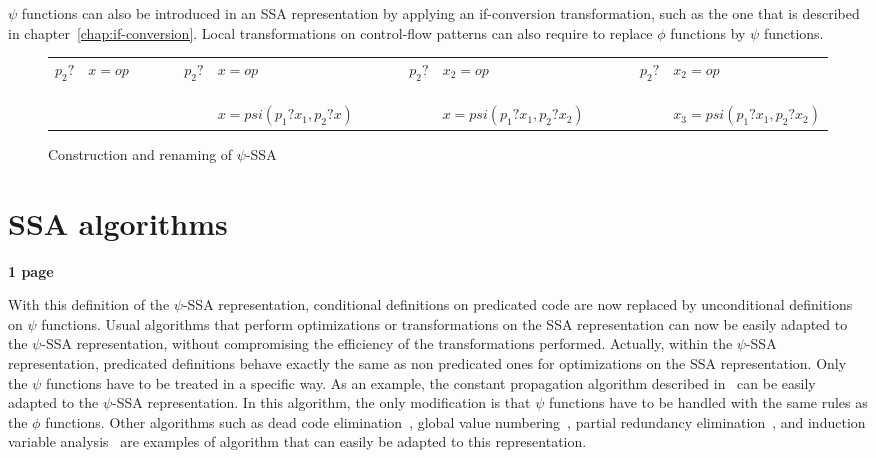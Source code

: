 $\psi$ functions can also be introduced in an SSA representation by
applying an if-conversion transformation, such as the one that is
described in chapter~\ref{chap:if-conversion}. Local transformations
on control-flow patterns can also require to replace $\phi$ functions
by $\psi$ functions.

\begin{figure}
\begin{center}
\footnotesize
\begin{tabular}{lllllllllll}
${p_2?}$ & ${x = op}$ & \ \ \ \  & ${p_2?}$ & ${x = op}$                  & \ \ \ \  & ${p_2?}$ & ${x_2 = op}$               & \ \ \ \  & ${p_2?}$ & ${x_2 = op}$ \\
             &                &          &              & ${x = psi(p_1?x_1, p_2?x)}$ &           &           & ${x = psi(p_1?x_1, p_2?x_2)}$ &          &           & ${x_3 = psi(p_1?x_1, p_2?x_2)}$ \\
\end{tabular}
\caption{Construction and renaming of $\psi$-SSA}
\label{fig:psi_ssa_construct}
\end{center}
\end{figure}


\section{SSA algorithms}

\textbf{1 page}


With this definition of the $\psi$-SSA representation, conditional
definitions on predicated code are now replaced by unconditional
definitions on $\psi$ functions. Usual algorithms that perform
optimizations or transformations on the SSA representation can now be
easily adapted to the $\psi$-SSA representation, without compromising
the efficiency of the transformations performed. Actually, within the
$\psi$-SSA representation, predicated definitions behave exactly the
same as non predicated ones for optimizations on the SSA
representation. Only the $\psi$ functions have to be treated in a
specific way. As an example, the constant propagation algorithm
described in~\cite{WZ91} can be easily adapted to the $\psi$-SSA
representation. In this algorithm, the only modification is that
$\psi$ functions have to be handled with the same rules as the $\phi$
functions. Other algorithms such as dead code
elimination~\cite{morgan98}, global value numbering~\cite{Cli95},
partial redundancy elimination~\cite{CCK+97}, and induction variable
analysis~\cite{Wolfe92} are examples of algorithm that can easily be
adapted to this representation.


